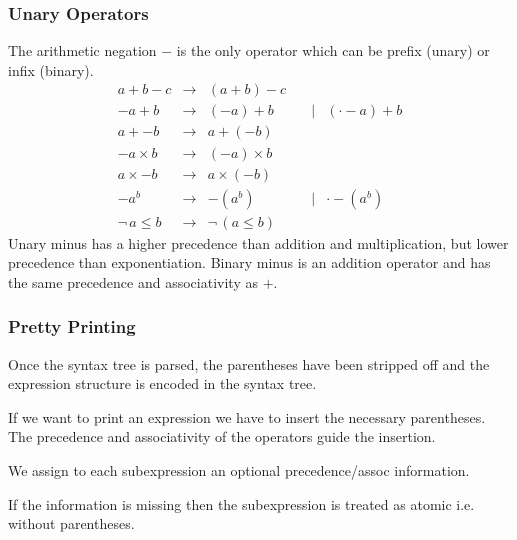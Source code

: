 \subsubsection{Unary Operators}

The arithmetic negation $-$ is the only operator which can be prefix (unary)
or infix (binary).
$$
%
\begin{array}{lllll}

  a + b - c
  & \to
  & (a + b) - c

  \\

  - a + b
  & \to
  & (-a) + b
  & \quad\mid
  & (\cdot - a) + b

  \\

  a + -b
  & \to
  & a + (-b)

  \\

  - a \times b
  & \to
  & (-a) \times b

  \\

  a \times -b
  & \to
  & a \times (-b)

  \\

  - a^b
  & \to
  & -( a^b)
  & \quad\mid
  & \cdot - (a ^ b)

  \\

  \lnot\, a \le b
  & \to
  & \lnot\, (a \le b)
\end{array}
$$
%
Unary minus has a higher precedence than addition and multiplication, but
lower precedence than exponentiation. Binary minus is an addition
operator and has the same precedence and associativity as $+$.




\subsubsection{Pretty Printing}

Once the syntax tree is parsed, the parentheses have been stripped off and the
expression structure is encoded in the syntax tree.

If we want to print an expression we have to insert the necessary parentheses.
The precedence and associativity of the operators guide the insertion.

We assign to each subexpression an optional precedence/assoc information.

If the information is missing then the subexpression is treated as atomic i.e.
without parentheses.

